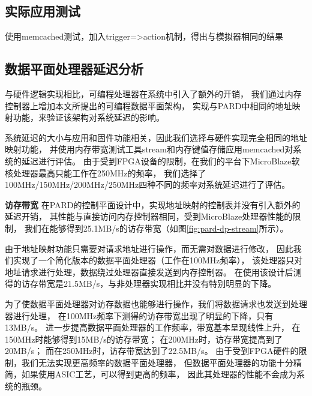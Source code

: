 \subsection{实际应用测试}

使用memcached测试，加入trigger=>action机制，得出与模拟器相同的结果


\subsection{数据平面处理器延迟分析}
\label{chap:impl:dp-latency}


与硬件逻辑实现相比，可编程处理器在系统中引入了额外的开销，
我们通过内存控制器上增加本文所提出的可编程数据平面架构，
实现与PARD中相同的地址映射功能，来验证该架构对系统延迟的影响。

系统延迟的大小与应用和固件功能相关，因此我们选择与硬件实现完全相同的地址映射功能，
并使用内存带宽测试工具stream和内存键值存储应用memcached对系统的延迟进行评估。
由于受到FPGA设备的限制，在我们的平台下MicroBlaze软核处理器最高只能工作在250MHz的频率，
我们选择了100MHz/150MHz/200MHz/250MHz四种不同的频率对系统延迟进行了评估。

\textbf{访存带宽}\quad
在PARD的控制平面设计中，实现地址映射的控制表并没有引入额外的延迟开销，
其性能与直接访问内存控制器相同，受到MicroBlaze处理器性能的限制，
我们在能够得到25.1MB/s的访存带宽（如图\ref{fig:pard-dp-stream}所示）。

由于地址映射功能只需要对请求地址进行操作，而无需对数据进行修改，
因此我们实现了一个简化版本的数据平面处理器（工作在100MHz频率），
该处理器只对地址请求进行处理，数据绕过处理器直接发送到内存控制器。
在使用该设计后测得的访存带宽是21.5MB/s，与非处理器实现相比并没有特别明显的下降。

为了使数据平面处理器对访存数据也能够进行操作，我们将数据请求也发送到处理器进行处理，
在100MHz频率下测得的访存带宽出现了明显的下降，只有13MB/s。
进一步提高数据平面处理器的工作频率，带宽基本呈现线性上升，
在150MHz时能够得到15MB/s的访存带宽；
在200MHz时，访存带宽提高到了20MB/s；
而在250MHz时，访存带宽达到了22.5MB/s。
由于受到FPGA硬件的限制，我们无法实现更高频率的数据平面处理器，
但数据平面处理器的功能十分精简，如果使用ASIC工艺，可以得到更高的频率，
因此其处理器的性能不会成为系统的瓶颈。

